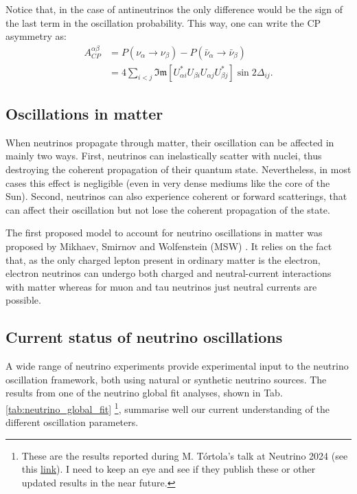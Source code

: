 Notice that, in the case of antineutrinos the only difference would be the sign of the last term in the oscillation probability. This way, one can write the CP asymmetry as:
\begin{equation}\label{2.9}
\begin{split}
A^{\alpha\beta}_{CP}&=P(\nu_{\alpha} \rightarrow \nu_{\beta})-P(\bar{\nu}_{\alpha} \rightarrow \bar{\nu}_{\beta})\\
&=4  \sum_{i<j} \mathfrak{Im}\left[U^{*}_{\alpha i} U_{\beta i} U_{\alpha j} U^{*}_{\beta j}\right] \sin 2\Delta_{ij}.
\end{split}
\end{equation}

\subsection{Oscillations in matter}

When neutrinos propagate through matter, their oscillation can be affected in mainly two ways. First, neutrinos can inelastically scatter with nuclei, thus destroying the coherent propagation of their quantum state. Nevertheless, in most cases this effect is negligible (even in very dense mediums like the core of the Sun). Second, neutrinos can also experience coherent or forward scatterings, that can affect their oscillation but not lose the coherent propagation of the state.

The first proposed model to account for neutrino oscillations in matter was proposed by Mikhaev, Smirnov and Wolfenstein (MSW) \cite{Wolfenstein1977}. It relies on the fact that, as the only charged lepton present in ordinary matter is the electron, electron neutrinos can undergo both charged and neutral-current interactions with matter whereas for muon and tau neutrinos just neutral currents are possible.

\subsection{Current status of neutrino oscillations}

A wide range of neutrino experiments provide experimental input to the neutrino oscillation framework, both using natural or synthetic neutrino sources. The results from one of the neutrino global fit analyses, shown in Tab. \ref{tab:neutrino_global_fit} \footnote{These are the results reported during M. T\'{o}rtola's talk at Neutrino 2024 (see this \href{https://agenda.infn.it/event/37867/contributions/233956/attachments/121839/178002/MTortola-Neutrino2024.pdf}{link}). I need to keep an eye and see if they publish these or other updated results in the near future.}, summarise well our current understanding of the different oscillation parameters.

